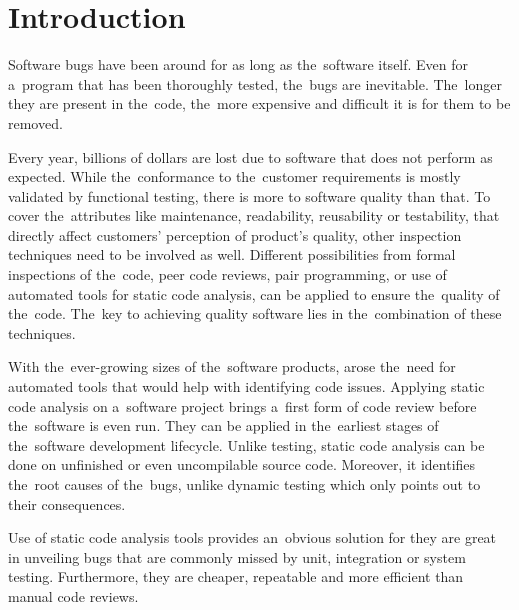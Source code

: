 \documentclass[
  digital, %
  table,   %
  lof,     %
  lot,     %
  oneside,
]{fithesis3}
\begin{document}
\chapter{Introduction}

Software bugs have been around for as long as the~software itself. Even for a~program that has been thoroughly tested, the~bugs are inevitable. The~longer they are present in the~code, the~more expensive and difficult it is for them to be removed. 

Every year, billions of dollars are lost due to software that does not perform as expected. 
While the~conformance to the~customer requirements is mostly validated by functional testing, there is more to software quality than that. To cover the~attributes like maintenance, readability, reusability or testability, that directly affect customers' perception of product's quality, other inspection techniques need to be involved as well. Different possibilities from formal inspections of the~code, peer code reviews, pair programming, or use of automated tools for static code analysis, can be applied to ensure the~quality of the~code. The~key to achieving quality software lies in the~combination of these techniques. 

With the~ever-growing sizes of the~software products, arose the~need for automated tools that would help with identifying code issues. Applying static code analysis on a~software project brings a~first form of code review before the~software is even run. They can be applied in the~earliest stages of the~software development lifecycle. Unlike testing, static code analysis can be done on unfinished or even uncompilable source code. Moreover, it identifies the~root causes of the~bugs, unlike dynamic testing which only points out to their consequences. 

Use of static code analysis tools provides an~obvious solution for they are great in unveiling bugs that are commonly missed by unit, integration or system testing. Furthermore, they are cheaper, repeatable and more efficient than manual code reviews. 
\end{document}
